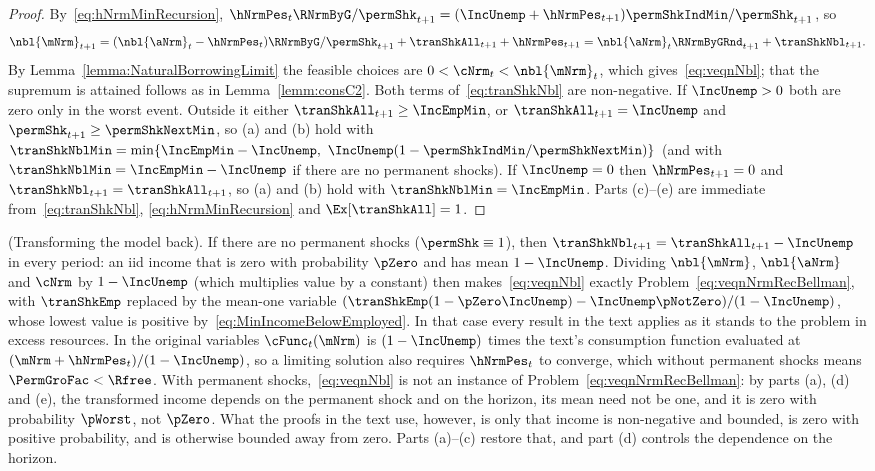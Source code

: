 \documentclass[\econtexRoot/BufferStockTheory]{subfiles}
\begin{document}
\begin{proof}
By~\eqref{eq:hNrmMinRecursion}, $\hNrmPes_{t}\RNrmByG/\permShk_{t+1}=(\IncUnemp+\hNrmPes_{t+1})\permShkIndMin/\permShk_{t+1}$, so
\begin{equation*}
  \nbl{\mNrm}_{t+1}=(\nbl{\aNrm}_{t}-\hNrmPes_{t})\RNrmByG/\permShk_{t+1}+\tranShkAll_{t+1}+\hNrmPes_{t+1}
  =\nbl{\aNrm}_{t}\RNrmByGRnd_{t+1}+\tranShkNbl_{t+1}.
\end{equation*}
By Lemma~\ref{lemma:NaturalBorrowingLimit} the feasible choices are $0<\cNrm_{t}<\nbl{\mNrm}_{t}$, which gives~\eqref{eq:veqnNbl}; that the supremum is attained follows as in Lemma~\ref{lemm:consC2}.
Both terms of~\eqref{eq:tranShkNbl} are non-negative.
If $\IncUnemp>0$ both are zero only in the worst event.
Outside it either $\tranShkAll_{t+1}\geq\IncEmpMin$, or $\tranShkAll_{t+1}=\IncUnemp$ and $\permShk_{t+1}\geq\permShkNextMin$, so (a) and (b) hold with $\tranShkNblMin=\min\{\IncEmpMin-\IncUnemp,\ \IncUnemp(1-\permShkIndMin/\permShkNextMin)\}$ (and with $\tranShkNblMin=\IncEmpMin-\IncUnemp$ if there are no permanent shocks).
If $\IncUnemp=0$ then $\hNrmPes_{t+1}=0$ and $\tranShkNbl_{t+1}=\tranShkAll_{t+1}$, so (a) and (b) hold with $\tranShkNblMin=\IncEmpMin$.
Parts (c)--(e) are immediate from~\eqref{eq:tranShkNbl}, \eqref{eq:hNrmMinRecursion} and $\Ex[\tranShkAll]=1$.
\end{proof}

\begin{remark}(Transforming the model back).\label{remark:TransformingBack}
If there are no permanent shocks ($\permShk\equiv 1$), then $\tranShkNbl_{t+1}=\tranShkAll_{t+1}-\IncUnemp$ in every period: an iid income that is zero with probability $\pZero$ and has mean $1-\IncUnemp$.
Dividing $\nbl{\mNrm}$, $\nbl{\aNrm}$ and $\cNrm$ by $1-\IncUnemp$ (which multiplies value by a constant) then makes~\eqref{eq:veqnNbl} exactly Problem~\eqref{eq:veqnNrmRecBellman}, with $\tranShkEmp$ replaced by the mean-one variable $(\tranShkEmp(1-\pZero\IncUnemp)-\IncUnemp\pNotZero)/(1-\IncUnemp)$, whose lowest value is positive by~\eqref{eq:MinIncomeBelowEmployed}.
In that case every result in the text applies as it stands to the problem in excess resources.
In the original variables $\cFunc_{t}(\mNrm)$ is $(1-\IncUnemp)$ times the text's consumption function evaluated at $(\mNrm+\hNrmPes_{t})/(1-\IncUnemp)$, so a limiting solution also requires $\hNrmPes_{t}$ to converge, which without permanent shocks means $\PermGroFac<\Rfree$.
With permanent shocks,~\eqref{eq:veqnNbl} is not an instance of Problem~\eqref{eq:veqnNrmRecBellman}: by parts (a), (d) and (e), the transformed income depends on the permanent shock and on the horizon, its mean need not be one, and it is zero with probability $\pWorst$, not $\pZero$.
What the proofs in the text use, however, is only that income is non-negative and bounded, is zero with positive probability, and is otherwise bounded away from zero.
Parts (a)--(c) restore that, and part (d) controls the dependence on the horizon.
\end{remark}
\end{document}
